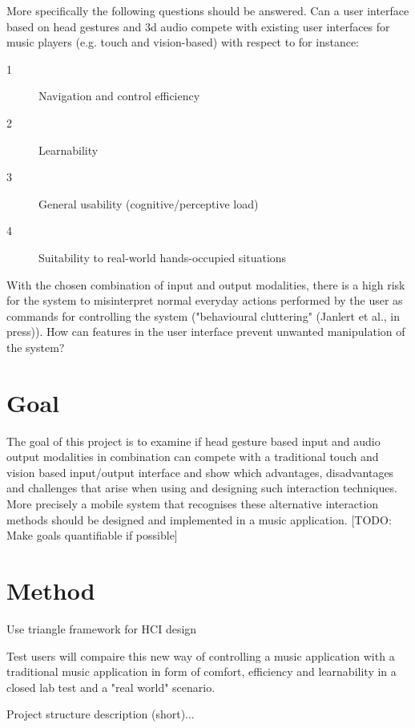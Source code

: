More specifically the following questions should be answered. Can a user interface based on head gestures and 3d audio compete with existing user interfaces for music players (e.g. touch and vision-based) with respect to for instance:
\begin{description}
\item[1] Navigation and control efficiency
\item[2] Learnability
\item[3] General usability (cognitive/perceptive load)
\item[4] Suitability to real-world hands-occupied situations
\end{description}
With the chosen combination of input and output modalities, there is a high risk for the system to misinterpret normal everyday actions performed by the user as commands for controlling the system ("behavioural cluttering" (Janlert et al., in press)). How can features in the user interface prevent unwanted manipulation of the system?

\section{Goal}
The goal of this project is to examine if head gesture based input and audio output modalities in combination can compete with a traditional touch and vision based input/output interface and show which advantages, disadvantages and challenges that arise when using and designing such interaction techniques. More precisely a mobile system that recognises these alternative interaction methods should be designed and implemented in a music application. [TODO: Make goals quantifiable if possible]

\section{Method}
Use triangle framework for HCI design \cite{mackay_hci_1997}

Test users will compaire this new way of controlling a music application with a traditional music application in form of comfort, efficiency and learnability in a closed lab test and a "real world" scenario.

Project structure description (short)...





